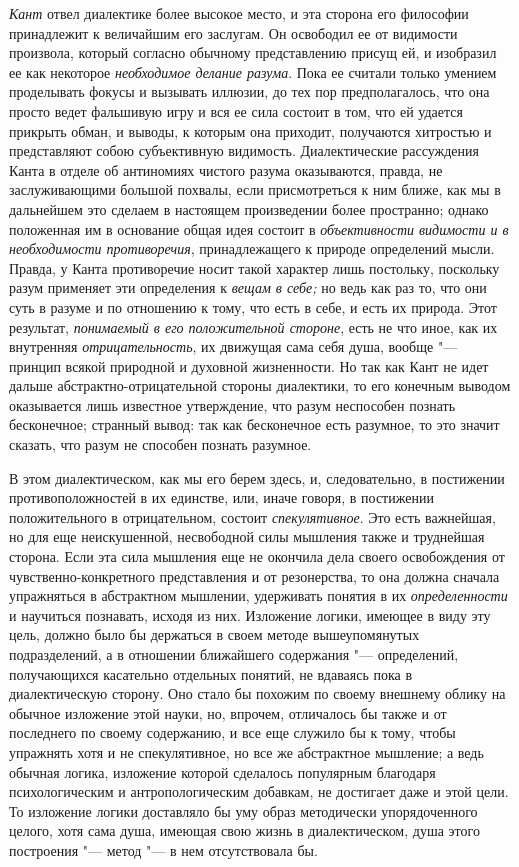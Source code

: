 {\em Кант} отвел диалектике более высокое место, и эта
сторона его философии принадлежит к величайшим его заслугам. Он освободил
ее от видимости произвола, который согласно обычному представлению присущ
ей, и изобразил ее как некоторое {\em необходимое
делание разума}. Пока ее считали только умением проделывать фокусы и
вызывать иллюзии, до тех пор предполагалось, что она просто ведет фальшивую
игру и вся ее сила состоит в том, что ей удается прикрыть обман, и выводы,
к которым она приходит, получаются хитростью и представляют собою
субъективную видимость. Диалектические рассуждения Канта в отделе об
антиномиях чистого разума оказываются, правда, не заслуживающими большой
похвалы, если присмотреться к ним ближе, как мы в дальнейшем это сделаем в
настоящем произведении более пространно; однако положенная им в основание
общая идея состоит в {\em объективности видимости и в
необходимости противоречия}, принадлежащего к природе определений мысли.
Правда, у Канта противоречие носит такой характер лишь постольку, поскольку
разум применяет эти определения к {\em вещам в себе;}
но ведь как раз то, что они суть в разуме и по отношению к тому, что есть в
себе, и есть их природа. Этот результат,
{\em понимаемый в его положительной стороне}, есть не
что иное, как их внутренняя {\em отрицательность}, их
движущая сама себя душа, вообще "--- принцип всякой природной и духовной
жизненности. Но так как Кант не идет дальше абстрактно-отрицательной
стороны диалектики, то его конечным выводом оказывается лишь известное
утверждение, что разум неспособен познать бесконечное; странный вывод: так
как бесконечное есть разумное, то это значит сказать, что разум не способен
познать разумное.

В этом диалектическом, как мы его берем здесь, и, следовательно, в
постижении противоположностей в их единстве, или, иначе говоря, в
постижении положительного в отрицательном, состоит
{\em спекулятивное}. Это есть важнейшая, но для еще
неискушенной, несвободной силы мышления также и труднейшая сторона. Если
эта сила мышления еще не окончила дела своего освобождения от
чувственно-конкретного представления и от резонерства, то она должна
сначала упражняться в абстрактном мышлении, удерживать понятия в их
{\em определенности} и научиться познавать, исходя из
них. Изложение логики, имеющее в виду эту цель, должно было бы держаться в
своем методе вышеупомянутых подразделений, а в отношении ближайшего
содержания "--- определений, получающихся касательно отдельных понятий, не
вдаваясь пока в диалектическую сторону. Оно стало бы похожим по своему
внешнему облику на обычное изложение этой науки, но, впрочем, отличалось бы
также и от последнего по своему содержанию, и все еще служило бы к тому,
чтобы упражнять хотя и не спекулятивное, но все же абстрактное мышление; а
ведь обычная логика, изложение которой сделалось популярным благодаря
психологическим и антропологическим добавкам, не достигает даже и этой
цели. То изложение логики доставляло бы уму образ методически
упорядоченного целого, хотя сама душа, имеющая свою жизнь в диалектическом,
душа этого построения "--- метод "--- в нем отсутствовала бы.

